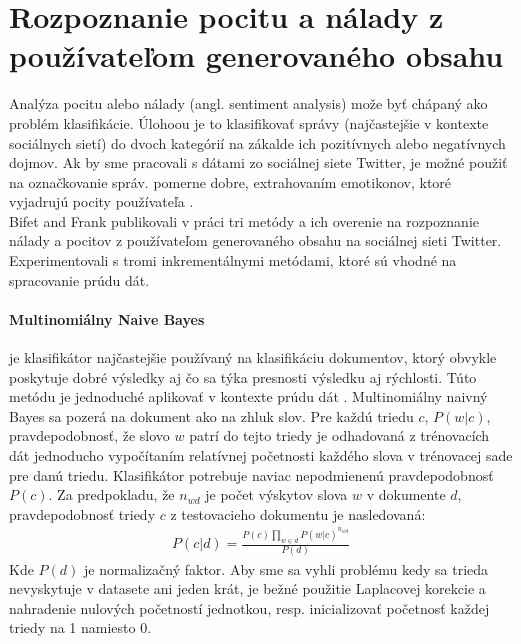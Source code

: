 \section{Rozpoznanie pocitu a nálady z používateľom generovaného obsahu}
Analýza pocitu alebo nálady (angl. sentiment analysis) može byť chápaný ako problém klasifikácie. Úlohoou je to klasifikovať správy (najčastejšie v kontexte sociálnych sietí) do dvoch kategórií na zákalde ich pozitívnych alebo negatívnych dojmov. Ak by sme pracovali s dátami zo sociálnej siete Twitter, je možné použiť na označkovanie správ. pomerne dobre, extrahovaním emotikonov, ktoré vyjadrujú pocity používateľa \citep{bifet2010sentiment}. \\
Bifet and Frank publikovali v práci \citep{bifet2010sentiment} tri metódy a ich overenie na rozpoznanie nálady a pocitov z používateľom generovaného obsahu na sociálnej sieti Twitter. Experimentovali s tromi inkrementálnymi metódami, ktoré sú vhodné na spracovanie prúdu dát.

\paragraph{Multinomiálny Naive Bayes} je klasifikátor najčastejšie používaný na klasifikáciu dokumentov, ktorý obvykle poskytuje dobré výsledky aj čo sa týka presnosti výsledku aj rýchlosti. Túto metódu je jednoduché aplikovať v kontexte prúdu dát \citep{bifet2010sentiment}. Multinomiálny naivný Bayes sa pozerá na dokument ako na zhluk slov. Pre každú triedu $c$, $P(w|c)$, pravdepodobnosť, že slovo $w$ patrí do tejto triedy je odhadovaná z trénovacích dát jednoducho vypočítaním relatívnej početnosti každého slova v trénovacej sade pre danú triedu. Klasifikátor potrebuje naviac nepodmienenú pravdepodobnosť $P(c)$. Za predpokladu, že $\displaystyle n_{wd}$ je počet výskytov slova $w$ v dokumente $d$, pravdepodobnosť triedy $c$ z testovacieho dokumentu je nasledovaná: \newline
\begin{align*}
P(c|d) = \frac{P(c)\prod _{w \in d} P(w|c)^{n_{wd}}} {P(d)}
\end{align*}
Kde $P(d)$ je normalizačný faktor. Aby sme sa vyhli problému kedy sa trieda nevyskytuje v datasete ani jeden krát, je bežné použitie Laplacovej korekcie a nahradenie nulových početností jednotkou, resp. inicializovať početnosť každej triedy na 1 namiesto 0.

